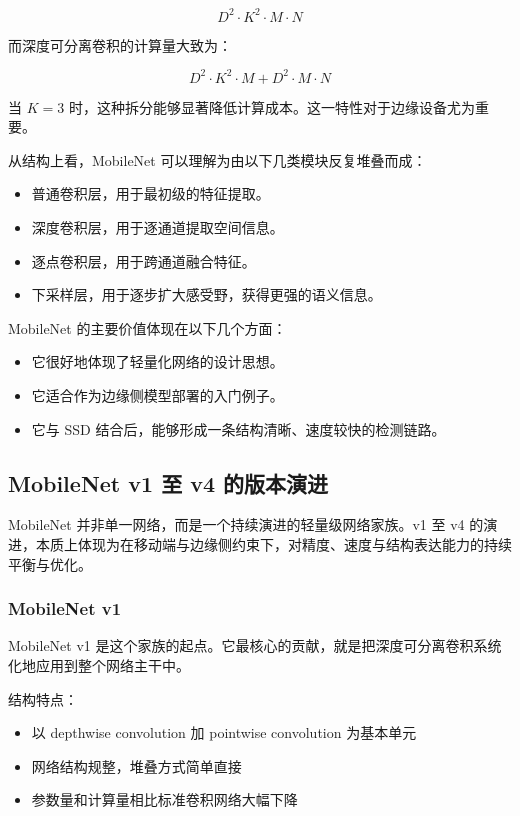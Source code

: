 \[
D^2 \cdot K^2 \cdot M \cdot N
\]

而深度可分离卷积的计算量大致为：

\[
D^2 \cdot K^2 \cdot M + D^2 \cdot M \cdot N
\]

当 \(K=3\)
时，这种拆分能够显著降低计算成本。这一特性对于边缘设备尤为重要。

从结构上看，MobileNet 可以理解为由以下几类模块反复堆叠而成：

\begin{itemize}
\tightlist
\item
  普通卷积层，用于最初级的特征提取。
\item
  深度卷积层，用于逐通道提取空间信息。
\item
  逐点卷积层，用于跨通道融合特征。
\item
  下采样层，用于逐步扩大感受野，获得更强的语义信息。
\end{itemize}

MobileNet 的主要价值体现在以下几个方面：

\begin{itemize}
\tightlist
\item
  它很好地体现了轻量化网络的设计思想。
\item
  它适合作为边缘侧模型部署的入门例子。
\item
  它与 SSD 结合后，能够形成一条结构清晰、速度较快的检测链路。
\end{itemize}

\subsection{MobileNet v1 至 v4
的版本演进}\label{src-experiment-case2-h8}

MobileNet 并非单一网络，而是一个持续演进的轻量级网络家族。v1 至 v4
的演进，本质上体现为在移动端与边缘侧约束下，对精度、速度与结构表达能力的持续平衡与优化。

\subsubsection{MobileNet v1}\label{src-experiment-case2-h9}

MobileNet v1
是这个家族的起点。它最核心的贡献，就是把深度可分离卷积系统化地应用到整个网络主干中。

结构特点：

\begin{itemize}
\tightlist
\item
  以 depthwise convolution 加 pointwise convolution 为基本单元
\item
  网络结构规整，堆叠方式简单直接
\item
  参数量和计算量相比标准卷积网络大幅下降
\end{itemize}

